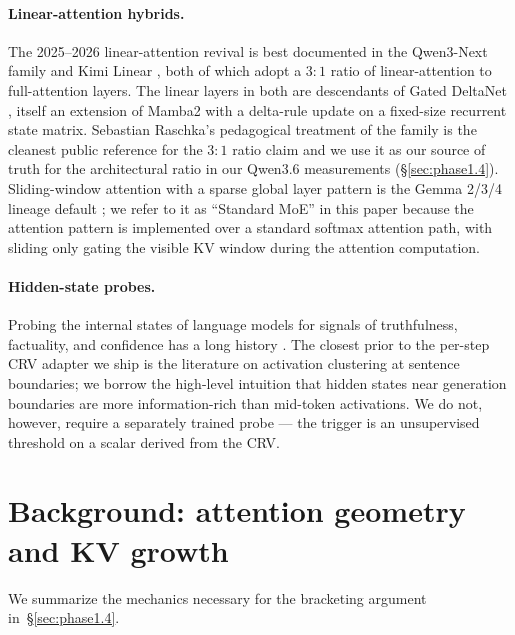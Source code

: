 \documentclass[11pt,letterpaper]{article}
\begin{document}
\paragraph{Linear-attention hybrids.}
The 2025–2026 linear-attention revival is best documented in the
Qwen3-Next family \citep{TODO:qwen3-next} and Kimi Linear
\citep{TODO:kimi-linear}, both of which adopt a $3{:}1$ ratio of
linear-attention to full-attention layers. The linear layers in both are
descendants of Gated DeltaNet \citep{TODO:gated-deltanet}, itself an
extension of Mamba2 \citep{TODO:mamba2} with a delta-rule update on a
fixed-size recurrent state matrix. Sebastian Raschka's pedagogical
treatment of the family \citep{TODO:raschka-deltanet} is the cleanest
public reference for the $3{:}1$ ratio claim and we use it as our source
of truth for the architectural ratio in our Qwen3.6 measurements
(\S\ref{sec:phase1.4}). Sliding-window attention with a sparse global
layer pattern is the Gemma 2/3/4 lineage default
\citep{TODO:gemma2, TODO:gemma3, TODO:gemma4-card}; we refer to it as
``Standard MoE'' in this paper because the attention pattern is
implemented over a standard softmax attention path, with sliding only
gating the visible KV window during the attention computation.

\paragraph{Hidden-state probes.}
Probing the internal states of language models for signals of
truthfulness, factuality, and confidence has a long history
\citep{TODO:probe1, TODO:probe2, TODO:probe3}. The closest prior to
the per-step CRV adapter we ship is the literature on activation
clustering at sentence boundaries; we borrow the high-level intuition
that hidden states near generation boundaries are more
information-rich than mid-token activations. We do not, however,
require a separately trained probe — the trigger is an unsupervised
threshold on a scalar derived from the CRV.

\section{Background: attention geometry and KV growth}
\label{sec:background}

We summarize the mechanics necessary for the bracketing argument
in~\S\ref{sec:phase1.4}.
\end{document}
